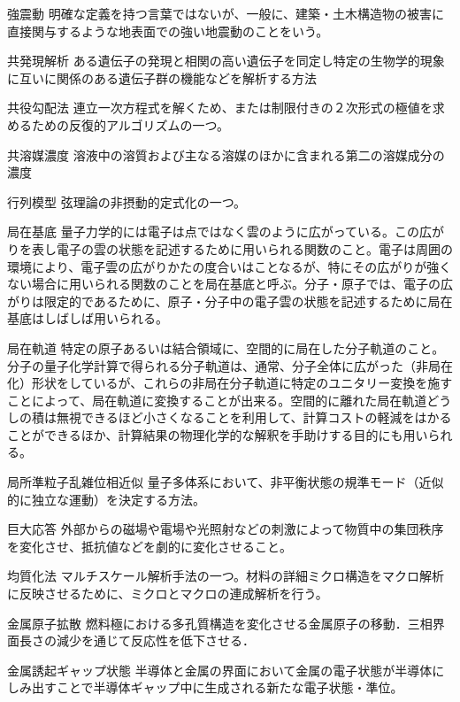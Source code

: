 \begin{用語集}
\item{強震動}{}
{明確な定義を持つ言葉ではないが、一般に、建築・土木構造物の被害に直接関与するような地表面での強い地震動のことをいう。}
\item{共発現解析}{}
{ある遺伝子の発現と相関の高い遺伝子を同定し特定の生物学的現象に互いに関係のある遺伝子群の機能などを解析する方法}
\item{共役勾配法}{}
{連立一次方程式を解くため、または制限付きの２次形式の極値を求めるための反復的アルゴリズムの一つ。}
\item{共溶媒濃度}{}
{溶液中の溶質および主なる溶媒のほかに含まれる第二の溶媒成分の濃度}
\item{行列模型}{}
{弦理論の非摂動的定式化の一つ。}
\item{局在基底}{}
{量子力学的には電子は点ではなく雲のように広がっている。この広がりを表し電子の雲の状態を記述するために用いられる関数のこと。電子は周囲の環境により、電子雲の広がりかたの度合いはことなるが、特にその広がりが強くない場合に用いられる関数のことを局在基底と呼ぶ。分子・原子では、電子の広がりは限定的であるために、原子・分子中の電子雲の状態を記述するために局在基底はしばしば用いられる。}
\item{局在軌道}{}
{特定の原子あるいは結合領域に、空間的に局在した分子軌道のこと。分子の量子化学計算で得られる分子軌道は、通常、分子全体に広がった（非局在化）形状をしているが、これらの非局在分子軌道に特定のユニタリー変換を施すことによって、局在軌道に変換することが出来る。空間的に離れた局在軌道どうしの積は無視できるほど小さくなることを利用して、計算コストの軽減をはかることができるほか、計算結果の物理化学的な解釈を手助けする目的にも用いられる。}
\item{局所準粒子乱雑位相近似}{}
{量子多体系において、非平衡状態の規準モード（近似的に独立な運動）を決定する方法。}
\item{巨大応答}{}
{外部からの磁場や電場や光照射などの刺激によって物質中の集団秩序を変化させ、抵抗値などを劇的に変化させること。}
\item{均質化法}{}
{マルチスケール解析手法の一つ。材料の詳細ミクロ構造をマクロ解析に反映させるために、ミクロとマクロの連成解析を行う。}
\item{金属原子拡散}{}
{燃料極における多孔質構造を変化させる金属原子の移動．三相界面長さの減少を通じて反応性を低下させる．}
\item{金属誘起ギャップ状態}{}
{半導体と金属の界面において金属の電子状態が半導体にしみ出すことで半導体ギャップ中に生成される新たな電子状態・準位。}

\end{用語集}
